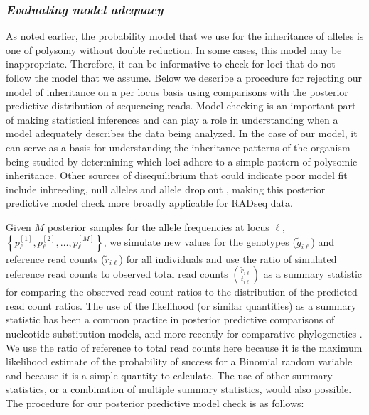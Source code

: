 \documentclass[11pt,english,letterpaper,oneside]{article}
\begin{document}
\subsubsection{{\itshape Evaluating model adequacy}}
\medskip

As noted earlier, the probability model that we use for the inheritance of alleles is one of polysomy without double reduction. In some cases, this model may be inappropriate. Therefore, it can be informative to check for loci that do not follow the model that we assume. Below we describe a procedure for rejecting our model of inheritance on a per locus basis using comparisons with the posterior predictive distribution of sequencing reads. Model checking is an important part of making statistical inferences and can play a role in understanding when a model adequately describes the data being analyzed. In the case of our model, it can serve as a basis for understanding the inheritance patterns of the organism being studied by determining which loci adhere to a simple pattern of polysomic inheritance. Other sources of disequilibrium that could indicate poor model fit include inbreeding, null alleles and allele drop out \citep[\textit{sensu}][]{arnold2013RADseq}, making this posterior predictive model check more broadly applicable for RADseq data.
\medskip

Given $M$ posterior samples for the allele frequencies at locus $\ell$, $\left\{p_{\ell}^{[1]},p_{\ell}^{[2]},\ldots,p_{\ell}^{[M]} \right\}$, we simulate new values for the genotypes ($\tilde{g}_{i \ell}$) and reference read counts ($\tilde{r}_{i \ell}$) for all individuals and use the ratio of simulated reference read counts to observed total read counts $\left( \frac{\tilde{r}_{i \ell}}{t_{i \ell}} \right) $ as a summary statistic for comparing the observed read count ratios to the distribution of the predicted read count ratios. The use of the likelihood (or similar quantities) as a summary statistic has been a common practice in posterior predictive comparisons of nucleotide substitution models, and more recently for comparative phylogenetics \citep{ripplinger2010DNAmodels,reid2014poorfit,pennell2015adequacy}. We use the ratio of reference to total read counts here because it is the maximum likelihood estimate of the probability of success for a Binomial random variable and because it is a simple quantity to calculate. The use of other summary statistics, or a combination of multiple summary statistics, would also possible. The procedure for our posterior predictive model check is as follows:
\medskip
\end{document}
